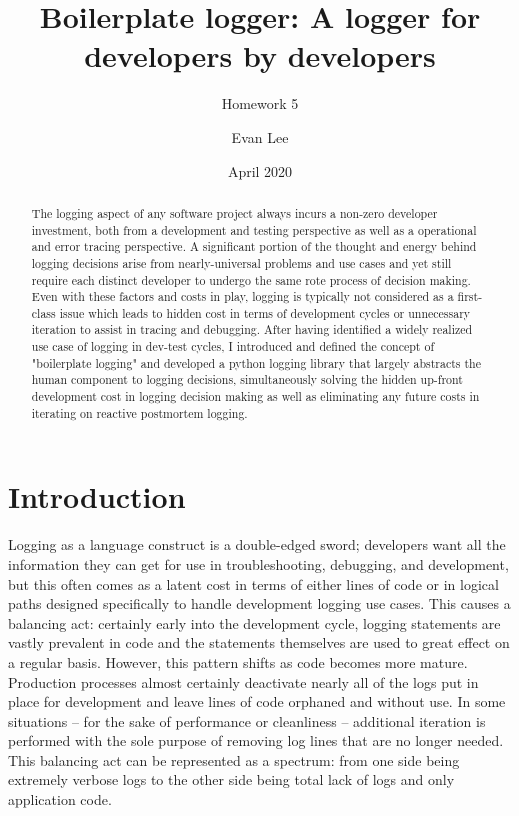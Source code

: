 \documentclass[acmsmall,review,authorversion]{acmart}
\title{Boilerplate logger: A logger for developers by developers}
\subtitle{Homework 5}
\author{Evan Lee}
\affiliation{%
    \institution{University of Colorado Boulder}
    \city{Boulder}
    \state{Colorado}
}
\date{April 2020}
\begin{document}
\begin{abstract}
    The logging aspect of any software project always incurs a non-zero developer investment, both from a development and testing perspective as well as a operational and error tracing perspective. A significant portion of the thought and energy behind logging decisions arise from nearly-universal problems and use cases and yet still require each distinct developer to undergo the same rote process of decision making. Even with these factors and costs in play, logging is typically not considered as a first-class issue which leads to hidden cost in terms of development cycles or unnecessary iteration to assist in tracing and debugging. After having identified a widely realized use case of logging in dev-test cycles, I introduced and defined the concept of "boilerplate logging" and developed a python logging library that largely abstracts the human component to logging decisions, simultaneously solving the hidden up-front development cost in logging decision making as well as eliminating any future costs in iterating on reactive postmortem logging.
\end{abstract}

\maketitle

\section{Introduction}

    Logging as a language construct is a double-edged sword; developers want all the information they can get for use in troubleshooting, debugging, and development, but this often comes as a latent cost in terms of either lines of code or in logical paths designed specifically to handle development logging use cases. This causes a balancing act: certainly early into the development cycle, logging statements are vastly prevalent in code and the statements themselves are used to great effect on a regular basis. However, this pattern shifts as code becomes more mature. Production processes almost certainly deactivate nearly all of the logs put in place for development and leave lines of code orphaned and without use. In some situations -- for the sake of performance or cleanliness -- additional iteration is performed with the sole purpose of removing log lines that are no longer needed. This balancing act can be represented as a spectrum: from one side being extremely verbose logs to the other side being total lack of logs and only application code.
    
\end{document}

